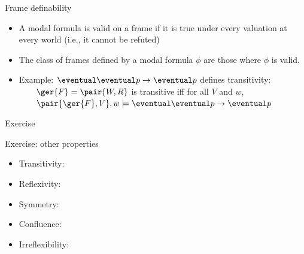 \documentclass{beamer}
\begin{document}
\begin{slide}{Frame definability}\label{s:32}
\small
\begin{itemize}
  \item A modal formula is valid on a frame if it is true under every valuation at every world (i.e., it cannot be refuted)
  \item The class of frames defined by a modal formula $\phi$ are those where $\phi$ is valid.
  \item Example: $\eventual\eventual p \to \eventual p$ defines transitivity:\\
  ~~~~$\ger{F}=\pair{W,R}$ is transitive iff for all $V$ and $w$,\\
  ~~~~$\pair{\ger{F},V},w\models \eventual\eventual p \to \eventual p $
\end{itemize}
\end{slide}
\begin{slide}{\red Exercise}\label{s:32}
\small

\begin{exampleblock}{Exercise: other properties}
\begin{itemize}
  \item Transitivity: 
  \item Reflexivity: 
  \item Symmetry:    
  \item Confluence:  
  \item Irreflexibility:  
\end{itemize}
\end{exampleblock}

\end{slide}

\end{document}
